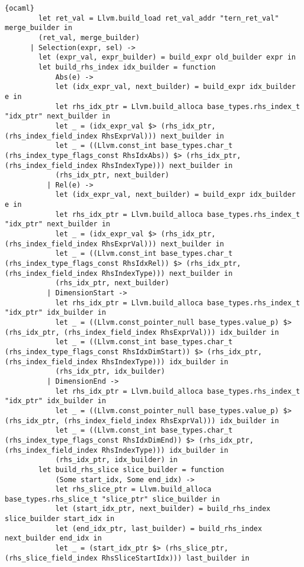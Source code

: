 \begin{lstlisting}{ocaml}
        let ret_val = Llvm.build_load ret_val_addr "tern_ret_val" merge_builder in
        (ret_val, merge_builder)
      | Selection(expr, sel) ->
        let (expr_val, expr_builder) = build_expr old_builder expr in
        let build_rhs_index idx_builder = function
            Abs(e) ->
            let (idx_expr_val, next_builder) = build_expr idx_builder e in
            let rhs_idx_ptr = Llvm.build_alloca base_types.rhs_index_t "idx_ptr" next_builder in
            let _ = (idx_expr_val $> (rhs_idx_ptr, (rhs_index_field_index RhsExprVal))) next_builder in
            let _ = ((Llvm.const_int base_types.char_t (rhs_index_type_flags_const RhsIdxAbs)) $> (rhs_idx_ptr, (rhs_index_field_index RhsIndexType))) next_builder in
            (rhs_idx_ptr, next_builder)
          | Rel(e) ->
            let (idx_expr_val, next_builder) = build_expr idx_builder e in
            let rhs_idx_ptr = Llvm.build_alloca base_types.rhs_index_t "idx_ptr" next_builder in
            let _ = (idx_expr_val $> (rhs_idx_ptr, (rhs_index_field_index RhsExprVal))) next_builder in
            let _ = ((Llvm.const_int base_types.char_t (rhs_index_type_flags_const RhsIdxRel)) $> (rhs_idx_ptr, (rhs_index_field_index RhsIndexType))) next_builder in
            (rhs_idx_ptr, next_builder)
          | DimensionStart ->
            let rhs_idx_ptr = Llvm.build_alloca base_types.rhs_index_t "idx_ptr" idx_builder in
            let _ = ((Llvm.const_pointer_null base_types.value_p) $> (rhs_idx_ptr, (rhs_index_field_index RhsExprVal))) idx_builder in
            let _ = ((Llvm.const_int base_types.char_t (rhs_index_type_flags_const RhsIdxDimStart)) $> (rhs_idx_ptr, (rhs_index_field_index RhsIndexType))) idx_builder in
            (rhs_idx_ptr, idx_builder)
          | DimensionEnd ->
            let rhs_idx_ptr = Llvm.build_alloca base_types.rhs_index_t "idx_ptr" idx_builder in
            let _ = ((Llvm.const_pointer_null base_types.value_p) $> (rhs_idx_ptr, (rhs_index_field_index RhsExprVal))) idx_builder in
            let _ = ((Llvm.const_int base_types.char_t (rhs_index_type_flags_const RhsIdxDimEnd)) $> (rhs_idx_ptr, (rhs_index_field_index RhsIndexType))) idx_builder in
            (rhs_idx_ptr, idx_builder) in
        let build_rhs_slice slice_builder = function
            (Some start_idx, Some end_idx) ->
            let rhs_slice_ptr = Llvm.build_alloca base_types.rhs_slice_t "slice_ptr" slice_builder in
            let (start_idx_ptr, next_builder) = build_rhs_index slice_builder start_idx in
            let (end_idx_ptr, last_builder) = build_rhs_index next_builder end_idx in
            let _ = (start_idx_ptr $> (rhs_slice_ptr, (rhs_slice_field_index RhsSliceStartIdx))) last_builder in

\end{lstlisting}
